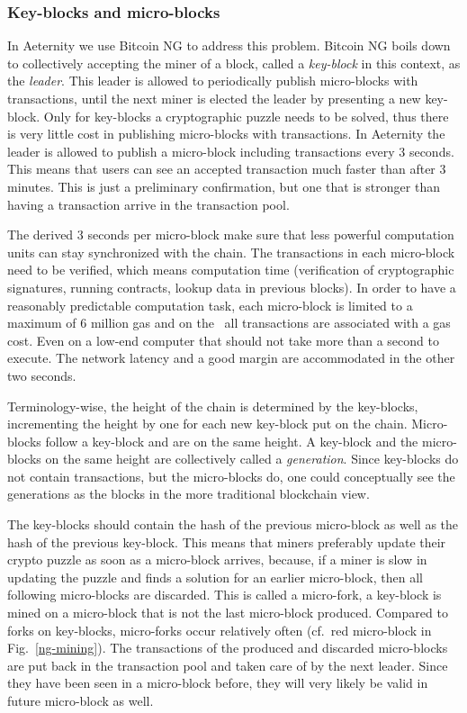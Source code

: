 \subsubsection{Key-blocks and micro-blocks}

In Aeternity we use Bitcoin NG \cite{Eyal:2016:BSB:2930611.2930615} to
address this problem. Bitcoin NG boils down to collectively accepting the miner of a
block, called a \textit{key-block} in this context, as the
\textit{leader}. This leader is allowed to periodically publish micro-blocks with
transactions, until the next miner is elected the leader by presenting a
new key-block. Only for key-blocks a cryptographic puzzle needs to be
solved, thus there is very little cost in publishing micro-blocks with
transactions. In Aeternity the leader is allowed to publish a
micro-block including transactions every 3 seconds. This means that
users can see an accepted transaction much faster than after 3
minutes. This is just a preliminary confirmation, but one that is
stronger than having a transaction arrive in the transaction pool.

The derived 3 seconds per micro-block make sure that less powerful
computation units can stay synchronized with the chain. The
transactions in each micro-block need to be verified, which means
computation time (verification of cryptographic signatures, running
contracts, lookup data in previous blocks). In order to have a
reasonably predictable computation task, each micro-block is limited to
a maximum of 6 million gas and on the \blockchain\ all
transactions are associated with a gas cost. Even on a low-end computer that should
not take more than a second to execute. The network latency and a good margin
are accommodated in the other two seconds.

Terminology-wise, the height of the chain is determined by the
key-blocks, incrementing the height by one for each new key-block put
on the chain. Micro-blocks follow a key-block and are on the same
height. A key-block and the micro-blocks on the same height are
collectively called a \textit{generation}. Since key-blocks do not contain
transactions, but the micro-blocks do, one could conceptually see the
generations as the blocks in the more traditional blockchain view.

The key-blocks should contain the hash of the previous micro-block as
well as the hash of the previous key-block. This means that miners
preferably update their crypto puzzle as soon as a micro-block
arrives, because, if a miner is slow in updating the puzzle and finds a solution for an earlier
micro-block, then all following micro-blocks are discarded. This is
called a micro-fork, a key-block is mined on a micro-block that is not
the last micro-block produced. Compared to forks on key-blocks,
micro-forks occur relatively often (cf.\ red micro-block in Fig.\ \ref{ng-mining}). The
transactions of the produced and discarded micro-blocks are put back in the
transaction pool and taken care of by the next leader. Since they have
been seen in a micro-block before, they will very likely be valid in
future micro-block as well.

